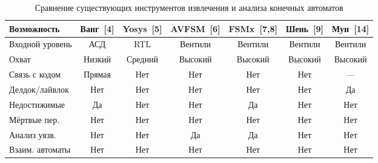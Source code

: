 \begin{table}[h]
    \centering
    \caption{Сравнение существующих инструментов извлечения и анализа конечных автоматов}
    \label{tab:existing_tools}
    \begin{tabular}{|l|c|c|c|c|c|c|}
        \hline
        Возможность & Ванг~[4] & Yosys~[5] & AVFSM~[6] & FSMx~[7,8] & Шень~[9] & Мун~[14] \\
        \hline
        Входной уровень & АСД & RTL & Вентили & Вентили & Вентили & Вентили \\
        \hline
        Охват & Низкий & Средний & Высокий & Высокий & Высокий & Высокий \\
        \hline
        Связь с кодом & Прямая & Нет & Нет & Нет & Нет & --- \\
        \hline
        Делдок/лайвлок & Нет & Нет & Нет & Нет & Нет & Да \\
        \hline
        Недостижимые & Да & Нет & Нет & Да & Нет & Нет \\
        \hline
        Мёртвые пер. & Нет & Нет & Нет & Нет & Нет & Нет \\
        \hline
        Анализ уязв. & Нет & Нет & Да & Да & Нет & Нет \\
        \hline
        Взаим. автоматы & Нет & Нет & Нет & Нет & Нет & Нет \\
        \hline
    \end{tabular}
\end{table}
